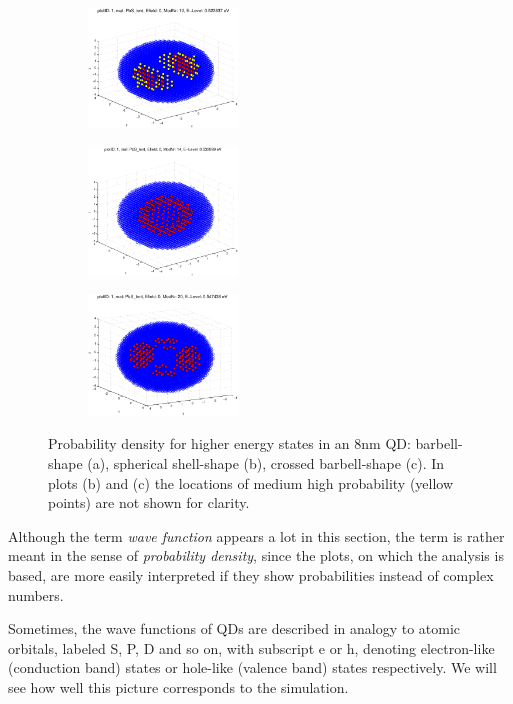 \begin{figure}[htbp]
	\centering
	\begin{subfigure}{150px}
		\includegraphics[width=150px]{Fig/Plots/r4CBmod10}
		\caption{}
	\end{subfigure}
	\begin{subfigure}{150px}
		\includegraphics[width=150px]{Fig/Plots/r4CBmod14}
		\caption{}
	\end{subfigure}
	\begin{subfigure}{150px}
		\includegraphics[width=150px]{Fig/Plots/r4CBmod20}
		\caption{}
	\end{subfigure}
	\caption{Probability density for higher energy states in an 8nm QD: barbell-shape (a), spherical shell-shape (b), crossed barbell-shape (c). In plots (b) and (c) the locations of medium high probability (yellow points) are not shown for clarity.}
	\label{fig:HigherModWaveFn}
\end{figure}
%

\begin{REMARK}
Although the term \textit{wave function} appears a lot in this section, the term is rather meant in the sense of \textit{probability density}, since the plots, on which the analysis is based, are more easily interpreted if they show probabilities instead of complex numbers.
\end{REMARK}

Sometimes, the wave functions of QDs are described in analogy to atomic orbitals, labeled S, P, D and so on, with subscript e or h, denoting electron-like (conduction band) states or hole-like (valence band) states respectively. We will see how well this picture corresponds to the simulation.

